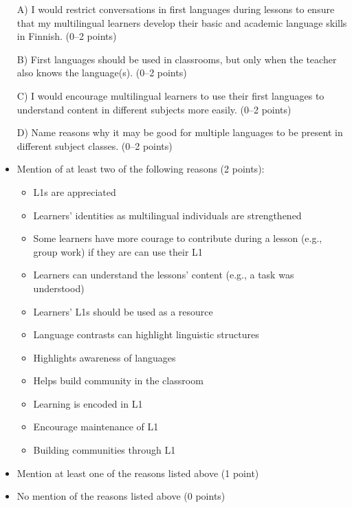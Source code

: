 \documentclass[output=paper]{langscibook}
\begin{document}

\begin{itemize}
	\item[A)] I would restrict conversations in first languages during lessons to ensure that my multilingual learners develop their basic and academic language skills in Finnish. (0–2 points)
	\item[B)] First languages should be used in classrooms, but only when the teacher also knows the language(s). (0–2 points)
	\item[C)] I would encourage multilingual learners to use their first languages to understand content in different subjects more easily. (0–2 points)
	\item[D)] Name reasons why it may be good for multiple languages to be present in different subject classes. (0–2 points)
\end{itemize}

\begin{itemize}
  \item Mention of at least two of the following reasons (2 points):            
    \begin{itemize}
		\item L1s are appreciated
		\item Learners’ identities as multilingual individuals are strengthened
		\item Some learners have more courage to contribute during a lesson (e.g., group work) if they are can use their L1
		\item Learners can understand the lessons’ content (e.g., a task was understood)
		\item Learners’ L1s should be used as a resource 
		\item Language contrasts can highlight linguistic structures			
		\item Highlights awareness of languages 
		\item Helps build community in the classroom 
		\item Learning is encoded in L1
		\item Encourage maintenance of L1 
		\item Building communities through L1
	\end{itemize}
  \item Mention at least one of the reasons listed above (1 point) 
  \item No mention of the reasons listed above (0 points)
\end{itemize}
\end{document}
